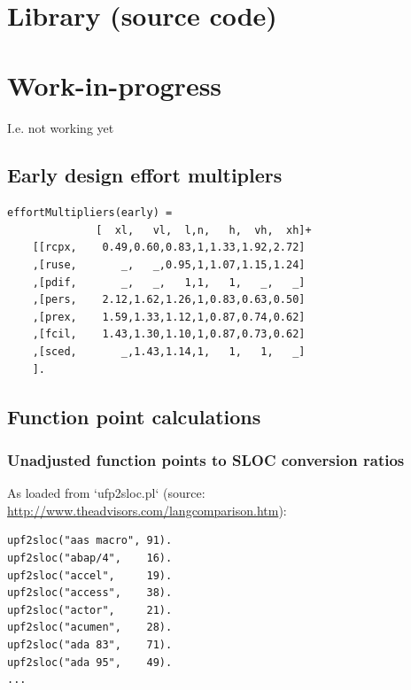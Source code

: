 \documentclass[twocolumn,global]{svjour}
\begin{document}
\section{ Library (source code)
}
\label{sec:libsrc}

\acknowledgement{}
{
\footnotesize 
\appendix

\section{ Work-in-progress
}
 I.e. not working yet
\subsection{ Early design effort multiplers  }\begin{Verbatim}
effortMultipliers(early) =
              [  xl,   vl,  l,n,   h,  vh,  xh]+
    [[rcpx,    0.49,0.60,0.83,1,1.33,1.92,2.72]
    ,[ruse,       _,   _,0.95,1,1.07,1.15,1.24]
    ,[pdif,       _,   _,   1,1,   1,   _,   _]
    ,[pers,    2.12,1.62,1.26,1,0.83,0.63,0.50]
    ,[prex,    1.59,1.33,1.12,1,0.87,0.74,0.62]
    ,[fcil,    1.43,1.30,1.10,1,0.87,0.73,0.62]
    ,[sced,       _,1.43,1.14,1,   1,   1,   _]
    ].
\end{Verbatim}
\subsection{ Function point calculations
}
\subsubsection{ Unadjusted function points to SLOC conversion ratios
}

As loaded from `ufp2sloc.pl`
(source: \url{http://www.theadvisors.com/langcomparison.htm}):
\begin{Verbatim}
upf2sloc("aas macro", 91).
upf2sloc("abap/4",    16).
upf2sloc("accel",     19).
upf2sloc("access",    38).
upf2sloc("actor",     21).
upf2sloc("acumen",    28).
upf2sloc("ada 83",    71).
upf2sloc("ada 95",    49).
...
\end{Verbatim}

}
\end{document}
